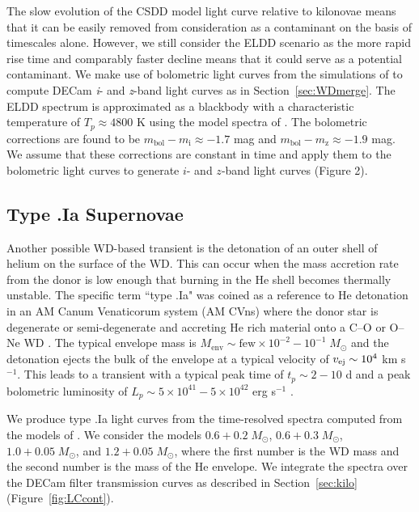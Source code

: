 The slow evolution of the CSDD model light curve relative to kilonovae means that it can be easily removed from consideration as a contaminant on the basis of timescales alone. However, we still consider the ELDD scenario as the more rapid rise time and comparably faster decline means that it could serve as a potential contaminant. We make use of bolometric light curves from the simulations of \citet{Sim+12} to compute DECam {\em i}- and {\em z}-band light curves as in Section~\ref{sec:WDmerge}. The ELDD spectrum is approximated as a blackbody with a characteristic temperature of $T_p \approx 4800$ K using the model spectra of \citet[see their Figure 7]{Sim+12}. The bolometric corrections are found to be $m_{\text{bol}} - m_{\text{i}} \approx -1.7$  mag and $m_{\text{bol}} - m_{\text{z}} \approx -1.9$ mag. We assume that these corrections are constant in time and apply them to the bolometric light curves to generate $i$- and $z$-band light curves (Figure 2).

\subsection{Type .Ia Supernovae}
\label{sec:type.Ia}
Another possible WD-based transient is the detonation of an outer shell of helium on the surface of the WD. This can occur when the mass accretion rate from the donor is low enough that burning in the He shell becomes thermally unstable. The specific term ``type .Ia" was coined as a reference to He detonation in an AM Canum Venaticorum system (AM CVns) where the donor star is degenerate or semi-degenerate and accreting He rich material onto a C--O or O--Ne WD \citet{Bildsten+07,Shen+10}. The typical envelope mass is $M_{\text{env}} \sim \text{few}\times10^{-2}-10^{-1}\;M_{\odot}$ and the detonation ejects the bulk of the envelope at a typical velocity of $v_{\rm ej} \sim 10^4$ km s$^{-1}$. This leads to a transient with a typical peak time of $t_p \sim 2-10$ d and a peak bolometric luminosity of $L_p \sim 5\times10^{41} - 5\times 10^{42}$ erg s$^{-1}$ \citep{Shen+10}.

We produce type .Ia light curves from the time-resolved spectra computed from the models of \citet{Shen+10}. We consider the models $0.6+0.2\;M_{\odot}$, $0.6+0.3\;M_{\odot}$, $1.0+0.05\;M_{\odot}$, and $1.2+0.05\;M_{\odot}$, where the first number is the WD mass and the second number is the mass of the He envelope. We integrate the spectra over the DECam filter transmission curves as described in Section~\ref{sec:kilo} (Figure~\ref{fig:LCcont}).


